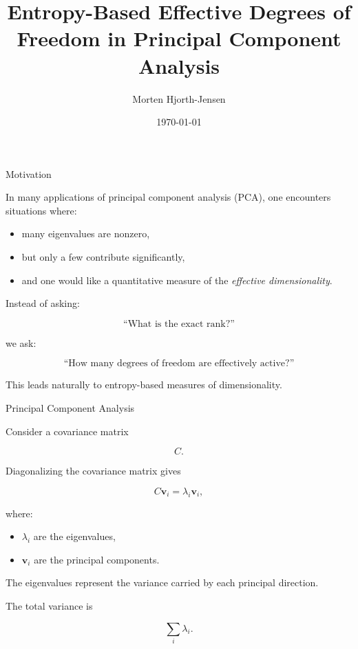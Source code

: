 \documentclass{beamer}
\title{Entropy-Based Effective Degrees of Freedom in Principal Component Analysis}
\author{Morten Hjorth-Jensen}
\date{\today}
\begin{document}
\begin{frame}
\titlepage
\end{frame}

\begin{frame}{Motivation}

In many applications of principal component analysis (PCA), one encounters situations where:

\begin{itemize}
    \item many eigenvalues are nonzero,
    \item but only a few contribute significantly,
    \item and one would like a quantitative measure of the
    \emph{effective dimensionality}.
\end{itemize}

\vspace{0.4cm}

Instead of asking:

\[
\text{``What is the exact rank?''}
\]

we ask:

\[
\text{``How many degrees of freedom are effectively active?''}
\]

\vspace{0.4cm}

This leads naturally to entropy-based measures of dimensionality.

\end{frame}

\begin{frame}{Principal Component Analysis}

Consider a covariance matrix

\[
C.
\]

Diagonalizing the covariance matrix gives

\[
C \mathbf{v}_i = \lambda_i \mathbf{v}_i,
\]

where:

\begin{itemize}
    \item $\lambda_i$ are the eigenvalues,
    \item $\mathbf{v}_i$ are the principal components.
\end{itemize}

\vspace{0.3cm}

The eigenvalues represent the variance carried by each principal direction.

\vspace{0.3cm}

The total variance is

\[
\sum_i \lambda_i.
\]

\end{frame}
\end{document}
